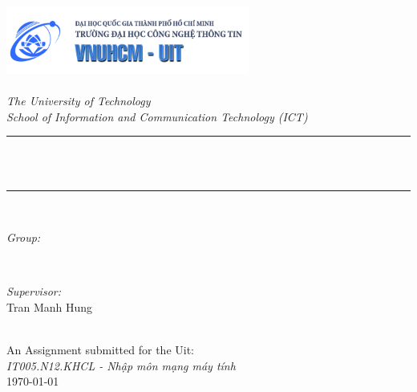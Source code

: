 \begin{titlepage}
\newcommand{\HRule}{\rule{\linewidth}{0.5mm}}
\includegraphics[width=8cm]{title/logo.png}\\[1cm] 
\center 
\quad\\[1.5cm]
\textsl{\Large The University of Technology}\\[0.5cm] 
\textsl{\large School of Information and Communication Technology (ICT)}\\[0.5cm] 
\makeatletter
\HRule \\[0.4cm]
{ \huge \bfseries \@title}\\[0.4cm] 
\HRule \\[1.5cm]
\begin{minipage}{0.4\textwidth}
\begin{flushleft} \large
\emph{Group:}\\
\@author 
\end{flushleft}
\end{minipage}
~
\begin{minipage}{0.4\textwidth}
\begin{flushright} \large
\emph{Supervisor:} \\
\textup{Tran Manh Hung}
\end{flushright}
\end{minipage}\\[3cm]
\makeatother
{\large An Assignment submitted for the Uit:}\\[0.5cm]
{\large \emph{IT005.N12.KHCL - Nhập môn mạng máy tính}}\\[0.5cm]
{\large \today}\\[2cm] 
\vfill 
\end{titlepage}